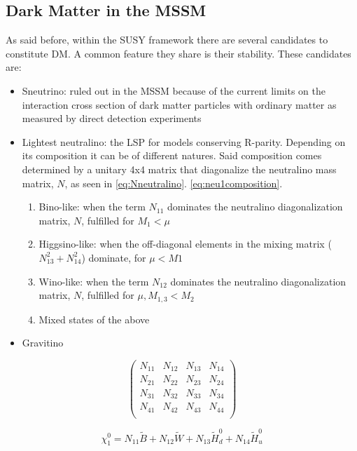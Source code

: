 \subsection{Dark Matter in the MSSM}
As said before, within the SUSY framework there are several candidates to constitute DM. A common feature they share is their stability. These candidates are:
\begin{itemize}
\item Sneutrino: ruled out in the MSSM because of the current limits on the interaction cross section of dark matter particles with ordinary matter as measured by direct detection experiments
\item Lightest neutralino: the LSP for models conserving R-parity. Depending on its composition it can be of different natures. Said composition comes determined by a unitary 4x4 matrix that diagonalize the neutralino mass matrix, $N$, as seen in \ref{eq:Nneutralino}. \ref{eq:neu1composition}. 
\begin{enumerate}
\item Bino-like: when the term $N_{11}$ dominates the neutralino diagonalization matrix, $N$, fulfilled for $M_1 < \mu$
\item Higgsino-like: when the off-diagonal elements in the mixing matrix ($N_{13}^2 + N_{14}^2$) dominate, for $\mu < M1$ 
\item Wino-like: when the term $N_{12}$ dominates the neutralino diagonalization matrix, $N$, fulfilled for $\mu, M_{1,3} < M_2$
\item Mixed states of the above 
\end{enumerate}
\item Gravitino
\end{itemize}

\begin{equation}
\left( \begin{matrix}
N_{11} & N_{12} & N_{13} & N_{14} \\ 
N_{21} & N_{22} & N_{23} & N_{24} \\
N_{31} & N_{32} & N_{33} & N_{34} \\ 
N_{41} & N_{42} & N_{43} & N_{44} \\
\end{matrix}\right)
\label{eq:Nneutralino}
\end{equation}

\begin{equation}
\chi_1^0 = N_{11}\tilde{B} + N_{12}\tilde{W} + N_{13} \tilde{H}_d^0 + N_{14}\tilde{H}_u^0
\label{eq:neu1composition}
\end{equation}

